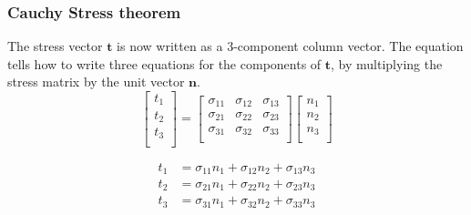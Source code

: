 \documentclass[notes]{beamer}
\begin{document}
\begin{frame}
	\frametitle{Cauchy Stress theorem}
	The stress vector $\mathbf{t}$ is now written as a 3-component column vector. The equation tells how to write three equations for the components of $\mathbf{t}$, by multiplying the stress matrix by the unit vector $\mathbf{n}$.
	\begin{equation*}
	\begin{bmatrix}
	t_1 \\
	t_2 \\
	t_3 \\
	\end{bmatrix} = %
	\begin{bmatrix}
	\sigma_{11} & \sigma_{12} & \sigma_{13}\\
	\sigma_{21} & \sigma_{22} & \sigma_{23} \\
	\sigma_{31} & \sigma_{32} & \sigma_{33} \\
	\end{bmatrix} %
	\begin{bmatrix}
	n_1 \\
	n_2 \\
	n_3 \\
	\end{bmatrix}
	\end{equation*}
	
	
	
	\begin{align*}
	t_1 & = 	\sigma_{11} n_1 + \sigma_{12} n_2 +  \sigma_{13} n_3 \\
	t_2 & = 	\sigma_{21} n_1 + \sigma_{22} n_2 +  \sigma_{23} n_3 \\
	t_3 & = 	\sigma_{31} n_1 + \sigma_{32} n_2 +  \sigma_{33} n_3 
	\end{align*}
	
\end{frame}
\end{document}
